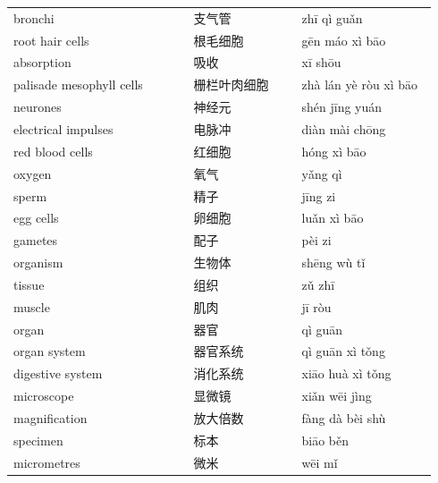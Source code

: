 \documentclass[11pt]{article}
\begin{document}
\begin{longtable}{@{}p{0.40\linewidth}p{0.24\linewidth}p{0.30\linewidth}@{}}
bronchi & 支气管 & zhī qì guǎn \\
root hair cells & 根毛细胞 & gēn máo xì bāo \\
absorption & 吸收 & xī shōu \\
palisade mesophyll cells & 栅栏叶肉细胞 & zhà lán yè ròu xì bāo \\
neurones & 神经元 & shén jīng yuán \\
electrical impulses & 电脉冲 & diàn mài chōng \\
red blood cells & 红细胞 & hóng xì bāo \\
oxygen & 氧气 & yǎng qì \\
sperm & 精子 & jīng zi \\
egg cells & 卵细胞 & luǎn xì bāo \\
gametes & 配子 & pèi zi \\
organism & 生物体 & shēng wù tǐ \\
tissue & 组织 & zǔ zhī \\
muscle & 肌肉 & jī ròu \\
organ & 器官 & qì guān \\
organ system & 器官系统 & qì guān xì tǒng \\
digestive system & 消化系统 & xiāo huà xì tǒng \\
microscope & 显微镜 & xiǎn wēi jìng \\
magnification & 放大倍数 & fàng dà bèi shù \\
specimen & 标本 & biāo běn \\
micrometres & 微米 & wēi mǐ \\
\end{longtable}
\end{document}
